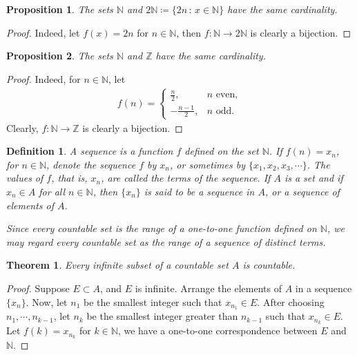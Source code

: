 \documentclass[11pt]{book}
\newtheorem{definition}{Definition}[chapter]
\newtheorem{theorem}{Theorem}[chapter]
\newtheorem{proposition}{Proposition}[chapter]
\theoremstyle{definition}
\numberwithin{equation}{chapter}
\begin{document}
\medskip

\begin{proposition}
The sets $\mathbb{N}$ and $2\mathbb{N} \coloneqq \{2n \,:\, x \in \mathbb{N}\}$ have the same cardinality.
\end{proposition}
\begin{proof}
Indeed, let $f(x) = 2n$ for $n \in \mathbb{N}$, then $f: \mathbb{N} \to 2\mathbb{N}$ is clearly a bijection.
\end{proof}

\medskip

\begin{proposition}
The sets $\mathbb{N}$ and $\mathbb{Z}$ have the same cardinality.
\end{proposition}
\begin{proof}
Indeed, for $n \in \mathbb{N}$, let
\begin{align*}
    f(n) = \begin{cases}
        \frac{n}{2}, & n \,\,\text{even}, \\
        - \frac{n-1}{2}, & n \,\,\text{odd}.
    \end{cases}
\end{align*}
Clearly, $f: \mathbb{N} \to \mathbb{Z}$ is clearly a bijection.
\end{proof}

\medskip

\begin{definition}
A sequence is a function $f$ defined on the set $\mathbb{N}$. If $f(n) = x_n$, for $n \in \mathbb{N}$, denote the sequence $f$ by ${x_n}$, or sometimes by $\{x_1, x_2, x_3, \cdots\}$. The values of $f$, that is, $x_n$, are called the terms of the sequence. If $A$ is a set and if $x_n \in A$ for all $n \in \mathbb{N}$, then $\{x_n\}$ is said to be a sequence in $A$, or a sequence of elements of $A$.

Since every countable set is the range of a one-to-one function defined on $\mathbb{N}$, we may regard every countable set as the range of a sequence of distinct terms.
\end{definition}

\medskip

\begin{theorem}\label{th_11}
Every infinite subset of a countable set $A$ is countable.
\end{theorem}
\begin{proof}
Suppose $E \subset A$, and $E$ is infinite. Arrange the elements of $A$ in a sequence $\{x_n\}$. Now, let $n_{1}$ be the smallest integer such that $x_{n_1} \in E$. After choosing $n_1, \cdots, n_{k-1}$, let $n_k$ be the smallest integer greater than $n_{k-1}$ such that $x_{n_k} \in E$. Let $f(k) = x_{n_k}$ for $k \in \mathbb{N}$, we have a one-to-one correspondence between $E$ and $\mathbb{N}$.
\end{proof}
\end{document}
